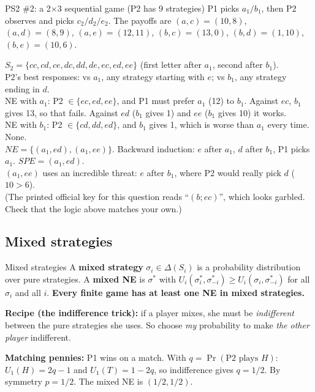 \documentclass[11pt]{article}
\begin{document}
\begin{workbox}{PS2 \#2: a 2$\times$3 sequential game (P2 has 9 strategies)}
P1 picks $a_1/b_1$, then P2 observes and picks $c_2/d_2/e_2$. The payoffs are
$(a,c)=(10,8)$, $(a,d)=(8,9)$, $(a,e)=(12,11)$, $(b,c)=(13,0)$, $(b,d)=(1,10)$, $(b,e)=(10,6)$.

$S_2=\{cc,cd,ce,dc,dd,de,ec,ed,ee\}$ (first letter after $a_1$, second after $b_1$).\\
P2's best responses: vs $a_1$, any strategy starting with $e$; vs $b_1$, any strategy ending in $d$.\\
NE with $a_1$: P2 $\in\{ec,ed,ee\}$, and P1 must prefer $a_1$ (12) to $b_1$. Against $ec$, $b_1$ gives 13, so that fails. Against $ed$ ($b_1$ gives 1) and $ee$ ($b_1$ gives 10) it works.\\
NE with $b_1$: P2 $\in\{cd,dd,ed\}$, and $b_1$ gives 1, which is worse than $a_1$ every time. None.\\
$NE=\{(a_1,ed),(a_1,ee)\}$. Backward induction: $e$ after $a_1$, $d$ after $b_1$, P1 picks $a_1$. $SPE=(a_1,ed)$.\\
$(a_1,ee)$ uses an incredible threat: $e$ after $b_1$, where P2 would really pick $d$ ($10>6$).\\
\small(The printed official key for this question reads ``$(b;ec)$'', which looks garbled. Check that the logic above matches your own.)
\end{workbox}

\subsection{Mixed strategies}
\begin{defbox}{Mixed strategies}
A \textbf{mixed strategy} $\sigma_i\in\Delta(S_i)$ is a probability distribution over pure strategies. A \textbf{mixed NE} is $\sigma^*$ with $U_i(\sigma_i^*,\sigma_{-i}^*)\ge U_i(\sigma_i,\sigma_{-i}^*)$ for all $\sigma_i$ and all $i$. \textbf{Every finite game has at least one NE in mixed strategies.}
\end{defbox}
\textbf{Recipe (the indifference trick):} if a player mixes, she must be \emph{indifferent} between the pure strategies she uses. So choose \emph{my} probability to make \emph{the other player} indifferent.

\textbf{Matching pennies:} P1 wins on a match. With $q=\Pr(\text{P2 plays }H)$: $U_1(H)=2q-1$ and $U_1(T)=1-2q$, so indifference gives $q=1/2$. By symmetry $p=1/2$. The mixed NE is $(1/2,1/2)$.
\end{document}

